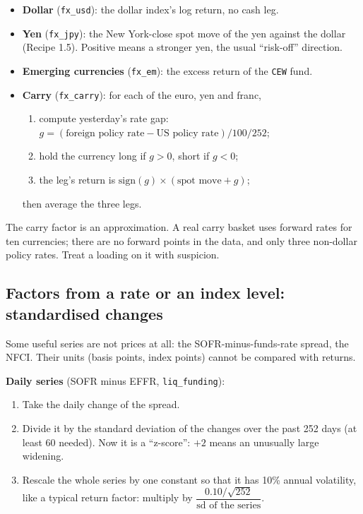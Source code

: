 \documentclass[11pt,a4paper]{article}
\newcommand{\fid}[1]{\texttt{#1}}
\newcommand{\ann}{\sqrt{252}}
\begin{document}
\begin{method}
\begin{itemize}[leftmargin=1.2em]
  \item \textbf{Dollar} (\fid{fx\_usd}): the dollar index's log return, no cash leg.
  \item \textbf{Yen} (\fid{fx\_jpy}): the New York-close spot move of the yen against the dollar (Recipe 1.5). Positive means a stronger yen, the usual ``risk-off'' direction.
  \item \textbf{Emerging currencies} (\fid{fx\_em}): the excess return of the \texttt{CEW} fund.
  \item \textbf{Carry} (\fid{fx\_carry}): for each of the euro, yen and franc,
  \begin{enumerate}[leftmargin=1.4em]
    \item compute yesterday's rate gap: $g = (\text{foreign policy rate} - \text{US policy rate})/100/252$;
    \item hold the currency long if $g>0$, short if $g<0$;
    \item the leg's return is $\text{sign}(g)\times(\text{spot move} + g)$;
  \end{enumerate}
  then average the three legs.
\end{itemize}
\end{method}

\begin{warn}
The carry factor is an approximation. A real carry basket uses forward rates for
ten currencies; there are no forward points in the data, and only three non-dollar
policy rates. Treat a loading on it with suspicion.
\end{warn}

\subsection{Factors from a rate or an index level: standardised changes}

Some useful series are not prices at all: the SOFR-minus-funds-rate spread, the
NFCI. Their units (basis points, index points) cannot be compared with returns.

\begin{method}
\textbf{Daily series} (SOFR minus EFFR, \fid{liq\_funding}):
\begin{enumerate}[leftmargin=1.4em]
  \item Take the daily change of the spread.
  \item Divide it by the standard deviation of the changes over the past 252 days (at least 60 needed). Now it is a ``z-score'': $+2$ means an unusually large widening.
  \item Rescale the whole series by one constant so that it has 10\% annual volatility, like a typical return factor: multiply by $\dfrac{0.10/\ann}{\text{sd of the series}}$.
\end{enumerate}
\end{method}
\end{document}
